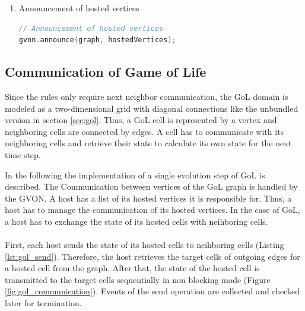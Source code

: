 \begin{enumerate}
\begin{enumerate}
\item Announcement of hosted vertices
  \begin{lstlisting}[language=C++, label=lst:gol_announce, caption={\ }]
// Announcement of hosted vertices
gvon.announce(graph, hostedVertices);
  \end{lstlisting}
  \end{enumerate}
\end{enumerate}

\subsection{Communication of Game of Life}
\label{sec:gol_imp}
Since the rules only require next neighbor communication, the GoL
domain is modeled as a two-dimensional grid with diagonal connections
like the unbundled version in section \ref{sec:gol}. Thus, a GoL cell
is represented by a vertex and neighboring cells are connected by
edges. A cell has to communicate with its neighboring cells and
retrieve their state to calculate its own state for the next time
step.

In the following the implementation of a single evolution step of GoL
is described. The Communication between vertices of the GoL graph
is handled by the GVON. A host has a list of its hosted vertices it is
responsible for. Thus, a host has to manage the communication of its
hosted vertices. In the case of GoL, a host has to exchange the state
of its hosted cells with neihboring cells.

\paragraph*{}
First, each host sends the state of its hosted cells to neihboring
cells (Listing \ref{lst:gol_send}). Therefore, the host retrieves the
target cells of outgoing edges for a hosted cell from the graph. After
that, the state of the hosted cell is transmitted to the target cells
sequentially in non blocking mode (Figure
\ref{fig:gol_communication}). Events of the send operation are
collected and checked later for termination.

